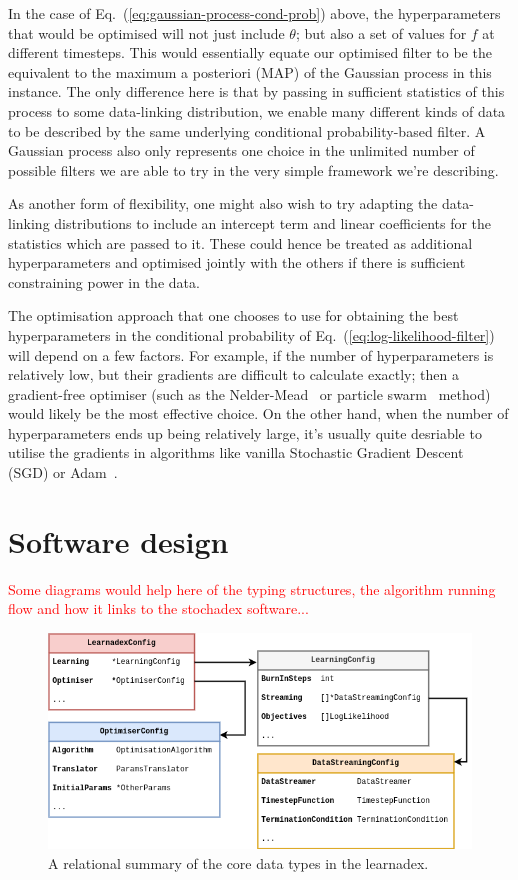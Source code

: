 In the case of Eq.~(\ref{eq:gaussian-process-cond-prob}) above, the hyperparameters that would be optimised will not just include $\theta$; but also a set of values for $f$ at different timesteps. This would essentially equate our optimised filter to be the equivalent to the maximum a posteriori (MAP) of the Gaussian process in this instance. The only difference here is that by passing in sufficient statistics of this process to some data-linking distribution, we enable many different kinds of data to be described by the same underlying conditional probability-based filter. A Gaussian process also only represents one choice in the unlimited number of possible filters we are able to try in the very simple framework we're describing. 

As another form of flexibility, one might also wish to try adapting the data-linking distributions to include an intercept term and linear coefficients for the statistics which are passed to it. These could hence be treated as additional hyperparameters and optimised jointly with the others if there is sufficient constraining power in the data.

The optimisation approach that one chooses to use for obtaining the best hyperparameters in the conditional probability of Eq.~(\ref{eq:log-likelihood-filter}) will depend on a few factors. For example, if the number of hyperparameters is relatively low, but their gradients are difficult to calculate exactly; then a gradient-free optimiser (such as the Nelder-Mead~\cite{nelder1965simplex} or particle swarm~\cite{kennedy1995particle, shi1998modified} method) would likely be the most effective choice. On the other hand, when the number of hyperparameters ends up being relatively large, it's usually quite desriable to utilise the gradients in algorithms like vanilla Stochastic Gradient Descent~\cite{robbins1951stochastic} (SGD) or Adam~\cite{kingma2014adam}.

\section{\sffamily Software design}

\textcolor{red}{Some diagrams would help here of the typing structures, the algorithm running flow and how it links to the stochadex software...}

\begin{figure}[h]
\centering
\includegraphics[width=13cm]{images/learnadex-data-types.drawio.png}
\caption{A relational summary of the core data types in the learnadex.}
\label{fig:learnadex-data-types-design}
\end{figure}


